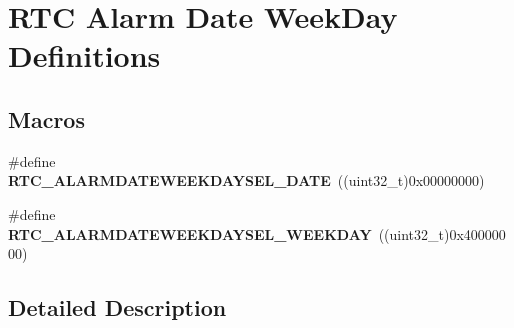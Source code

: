 \hypertarget{group___r_t_c___alarm_date_week_day___definitions}{}\section{R\+TC Alarm Date Week\+Day Definitions}
\label{group___r_t_c___alarm_date_week_day___definitions}
\subsection*{Macros}
\begin{DoxyCompactItemize}
\item 
\#define {\bfseries R\+T\+C\+\_\+\+A\+L\+A\+R\+M\+D\+A\+T\+E\+W\+E\+E\+K\+D\+A\+Y\+S\+E\+L\+\_\+\+D\+A\+TE}~((uint32\+\_\+t)0x00000000)\hypertarget{group___r_t_c___alarm_date_week_day___definitions_ga038032416e6bcf81e842f60dcfe91e15}{}\label{group___r_t_c___alarm_date_week_day___definitions_ga038032416e6bcf81e842f60dcfe91e15}

\item 
\#define {\bfseries R\+T\+C\+\_\+\+A\+L\+A\+R\+M\+D\+A\+T\+E\+W\+E\+E\+K\+D\+A\+Y\+S\+E\+L\+\_\+\+W\+E\+E\+K\+D\+AY}~((uint32\+\_\+t)0x40000000)\hypertarget{group___r_t_c___alarm_date_week_day___definitions_ga3dfe8546eb760b9928900ac80a27e625}{}\label{group___r_t_c___alarm_date_week_day___definitions_ga3dfe8546eb760b9928900ac80a27e625}

\end{DoxyCompactItemize}


\subsection{Detailed Description}
